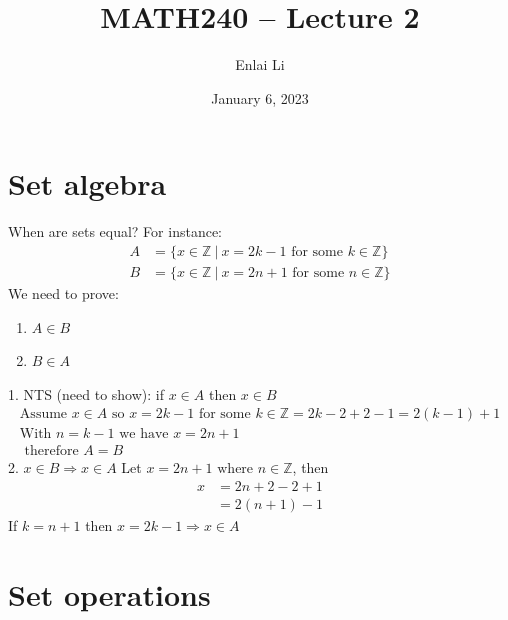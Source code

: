 \documentclass{article}
\author{Enlai Li}
\title{MATH240 -- Lecture 2}
\date{January 6, 2023}
\begin{document}
\maketitle
\section{Set algebra}
When are sets equal? For instance:
\begin{align*}
    A & = \{x \in \mathbb{Z} \ | \ x=2k-1 \text{ for some } k \in \mathbb{Z}\} \\
    B & = \{x \in \mathbb{Z} \ | \ x=2n+1 \text{ for some } n \in \mathbb{Z}\}
\end{align*}
We need to prove:
\begin{enumerate}
    \item $A \in B$
    \item $B \in A$
\end{enumerate}
1. NTS (need to show): if $x \in A$ then $x \in B$
\begin{gather*}
    \text{Assume } x \in A \text{ so } x = 2k-1 \text{ for some }k\in \mathbb{Z}
    = 2k-2+2-1
    =2(k-1)+1  \\
    \text{With }n=k-1 \text{ we have }x=2n+1 \\ \text{ therefore } A=B
\end{gather*}
2. $x \in B \Rightarrow x\in A$
Let $x=2n+1 \text{ where } n\in \mathbb{Z}$, then
\begin{align*}
    x & =2n+2-2+1 \\
      & =2(n+1)-1
\end{align*}
If $k=n+1$ then $x=2k-1 \Rightarrow x\in A$

\section{Set operations}
\end{document}

